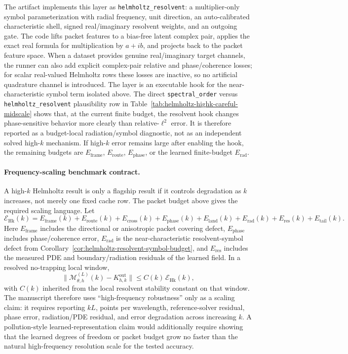 The artifact implements this layer as \texttt{helmholtz\_resolvent}: a multiplier-only symbol parameterization with radial frequency, unit direction, an auto-calibrated characteristic shell, signed real/imaginary resolvent weights, and an outgoing gate.  The code lifts packet features to a bias-free latent complex pair, applies the exact real formula for multiplication by $a+ib$, and projects back to the packet feature space.  When a dataset provides genuine real/imaginary target channels, the runner can also add explicit complex-pair relative and phase/coherence losses; for scalar real-valued Helmholtz rows these losses are inactive, so no artificial quadrature channel is introduced.  The layer is an executable hook for the near-characteristic symbol term isolated above.  The direct \texttt{spectral\_order} versus \texttt{helmholtz\_resolvent} plausibility row in Table~\ref{tab:helmholtz-highk-careful-midscale} shows that, at the current finite budget, the resolvent hook changes phase-sensitive behavior more clearly than relative-$\ell^2$ error.  It is therefore reported as a budget-local radiation/symbol diagnostic, not as an independent solved high-$k$ mechanism.  If high-$k$ error remains large after enabling the hook, the remaining budgets are $E_{\mathrm{frame}}$, $E_{\mathrm{route}}$, $E_{\mathrm{phase}}$, or the learned finite-budget $E_{\mathrm{rad}}$.

\paragraph{Frequency-scaling benchmark contract.}
A high-$k$ Helmholtz result is only a flagship result if it controls degradation as $k$ increases, not merely one fixed cache row.  The packet budget above gives the required scaling language.  Let
\[
\mathcal E_{\mathrm{Hk}}(k)
=
E_{\mathrm{frame}}(k)+E_{\mathrm{route}}(k)+E_{\mathrm{cross}}(k)
+E_{\mathrm{phase}}(k)+E_{\mathrm{land}}(k)+E_{\mathrm{rad}}(k)
+E_{\mathrm{res}}(k)+E_{\mathrm{tail}}(k).
\]
Here $E_{\mathrm{frame}}$ includes the directional or anisotropic packet covering defect, $E_{\mathrm{phase}}$ includes phase/coherence error, $E_{\mathrm{rad}}$ is the near-characteristic resolvent-symbol defect from Corollary~\ref{cor:helmholtz-resolvent-symbol-budget}, and $E_{\mathrm{res}}$ includes the measured PDE and boundary/radiation residuals of the learned field.  In a resolved no-trapping local window,
\[
\|\mathcal M_{\theta,h}^{(L)}(k)-K^{\mathrm{out}}_{h,k}\|
\le C(k)\,\mathcal E_{\mathrm{Hk}}(k),
\]
with $C(k)$ inherited from the local resolvent stability constant on that window.  The manuscript therefore uses ``high-frequency robustness'' only as a scaling claim: it requires reporting $kL$, points per wavelength, reference-solver residual, phase error, radiation/PDE residual, and error degradation across increasing $k$.  A pollution-style learned-representation claim would additionally require showing that the learned degrees of freedom or packet budget grow no faster than the natural high-frequency resolution scale for the tested accuracy.

